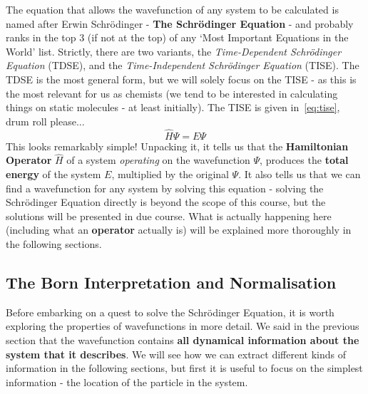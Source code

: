 \documentclass{memoir}[11pt,oneside,a4paper,openany]
\newcommand{\wf}{\ensuremath{\Psi}\xspace}
\begin{document}
The equation that allows the wavefunction of any system to be calculated is named after Erwin Schr{\"o}dinger - \textbf{The Schr{\"o}dinger Equation} - and probably ranks in the top 3 (if not at the top) of any `Most Important Equations in the World' list. Strictly, there are two variants, the \emph{Time-Dependent Schr{\"o}dinger Equation} (TDSE), and the \emph{Time-Independent Schr{\"o}dinger Equation} (TISE). The TDSE is the most general form, but we will solely focus on the TISE - as this is the most relevant for us as chemists (we tend to be interested in calculating things on static molecules - at least initially). The TISE is given in~\autoref{eq:tise}, drum roll please...
\begin{equation}\label{eq:tise}
	\hat{H}\wf = E\wf
\end{equation}
This looks remarkably simple! Unpacking it, it tells us that the \textbf{Hamiltonian Operator} $\hat{H}$ of a system \emph{operating} on the wavefunction \wf, produces the \textbf{total energy} of the system $E$, multiplied by the original \wf. It also tells us that we can find a wavefunction for any system by solving this equation - solving the Schr{\"o}dinger Equation directly is beyond the scope of this course, but the solutions will be presented in due course. What is actually happening here (including what an \textbf{operator} actually is) will be explained more thoroughly in the following sections. 

\subsection{The Born Interpretation and Normalisation}
Before embarking on a quest to solve the Schr{\"o}dinger Equation, it is worth exploring the properties of wavefunctions in more detail. We said in the previous section that the wavefunction contains \textbf{all dynamical information about the system that it describes}. We will see how we can extract different kinds of information in the following sections, but first it is useful to focus on the simplest information - the location of the particle in the system. 
\end{document}
